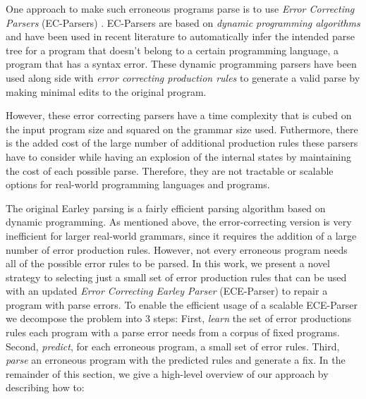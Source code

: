 One approach to make such erroneous programs parse is to use \emph{Error
Correcting Parsers} (EC-Parsers) \citep{Aho_1972}. EC-Parsers are based on
\emph{dynamic programming algorithms} and have been used in recent literature to
automatically infer the intended parse tree for a program that doesn't belong to
a certain programming language, \ie a program that has a syntax error. These
dynamic programming parsers have been used along side with \emph{error
correcting production rules} \citep{Aho_1972} to generate a valid parse by
making minimal edits to the original program.

However, these error correcting parsers have a time complexity that is cubed on
the input program size and squared on the grammar size used. Futhermore, there
is the added cost of the large number of additional production rules these
parsers have to consider while having an explosion of the internal states by
maintaining the cost of each possible parse. Therefore, they are not tractable
or scalable options for real-world programming languages and programs.


The original Earley parsing is a fairly efficient parsing algorithm
\citep{Earley_1970} based on dynamic programming. As mentioned above, the
error-correcting version is very inefficient for larger real-world grammars,
since it requires the addition of a large number of error production rules.
However, not every erroneous program needs all of the possible error rules to be
parsed. In this work, we present a novel strategy to selecting just a small set
of error production rules that can be used with an updated \emph{Error
Correcting Earley Parser} (ECE-Parser) to repair a program with parse errors.
%
To enable the efficient usage of a scalable ECE-Parser we decompose the problem
into 3 steps:
%
First, \emph{learn} the set of error productions rules each program with a parse
error needs from a corpus of fixed programs.
%
Second, \emph{predict}, for each erroneous program, a small set of error rules.
%
Third, \emph{parse} an erroneous program with the predicted rules and generate a
fix.
%
In the remainder of this section, we give a high-level overview
of our approach by describing how to:

